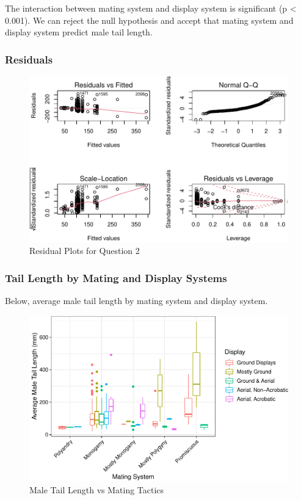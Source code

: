 \documentclass[
  12pt,
]{article}
\begin{document}
The interaction between mating system and display system is significant
(p \textless{} 0.001). We can reject the null hypothesis and accept that
mating system and display system predict male tail length.

\hypertarget{residuals-1}{%
\subsubsection{Residuals}\label{residuals-1}}

\begin{figure}
\centering
\includegraphics{Project_Code_files/figure-latex/q-2 residual-1.pdf}
\caption{Residual Plots for Question 2}
\end{figure}

\newpage

\hypertarget{tail-length-by-mating-and-display-systems}{%
\subsubsection{Tail Length by Mating and Display
Systems}\label{tail-length-by-mating-and-display-systems}}

Below, average male tail length by mating system and display system.

\begin{figure}
\centering
\includegraphics{Project_Code_files/figure-latex/q-2-plots-1.pdf}
\caption{Male Tail Length vs Mating Tactics}
\end{figure}
\end{document}
